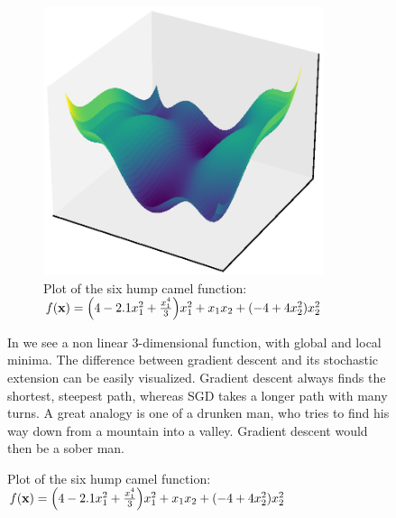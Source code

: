 \begin{figure}[H]
    \centering
    \begin{minipage}{0.45\textwidth}
        \centering
        \begin{figure}[H]
            \label{fig:six-hump-camel-function}
            \centering
            \includegraphics*[width=0.9\textwidth]{./deep-learning/six-hump-camel-function-resized.eps}
            \caption{Plot of the six hump camel function: \( f(\mathbf{x}) = \Big( 4 - 2.1 x^{2}_{1} + \frac{x^{4}_{1}}{3} \Big) x^{2}_{1} + x_{1}x_{2} + (-4 + 4x^{2}_{2}) x^{2}_{2} \)}
        \end{figure}
    \end{minipage}\hfill
    \begin{minipage}{0.45\textwidth}        
        In  we see a non linear \(3\)-dimensional function, with global and local minima.
        The difference between gradient descent and its stochastic extension can be easily visualized.
        Gradient descent always finds the shortest, steepest path, whereas SGD takes a longer path with many turns.
        A great analogy is one of a drunken man, who tries to find his way down from a mountain into a valley.
        Gradient descent would then be a sober man.
    \end{minipage}
\end{figure}